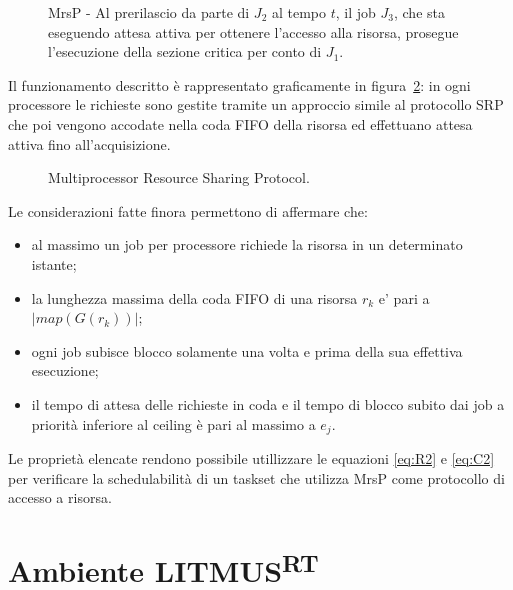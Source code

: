 \begin{figure}
\centering
\MrsPProtocols
\caption{MrsP - Al prerilascio da parte di $J_2$ al tempo $t$, il job $J_3$, che sta eseguendo attesa attiva per ottenere l'accesso alla risorsa, prosegue l'esecuzione della sezione critica per conto di $J_1$.}
\label{fig:MrsPProtocols}
\end{figure}

Il funzionamento descritto è rappresentato graficamente in figura~\ref{fig:locks.mrsp}: in ogni processore le richieste sono gestite tramite un approccio simile al protocollo SRP che poi vengono accodate nella coda FIFO della risorsa ed effettuano attesa attiva fino all'acquisizione.\\

\begin{figure}
\centering
{}
\caption{Multiprocessor Resource Sharing Protocol.}
\label{fig:locks.mrsp}
\end{figure}

Le considerazioni fatte finora permettono di affermare che:

\begin{itemize}
\item al massimo un job per processore richiede la risorsa in un determinato istante;
\item la lunghezza massima della coda FIFO di una risorsa $r_k$ e’ pari a $| map(G(r_k)) |$;
\item ogni job subisce blocco solamente una volta e prima della sua effettiva esecuzione;
\item il tempo di attesa delle richieste in coda e il tempo di blocco subito dai job a priorità inferiore al ceiling  è pari al massimo a $e_j$.
\end{itemize}

Le proprietà elencate rendono possibile utillizzare le equazioni \ref{eq:R2} e \ref{eq:C2} per verificare la schedulabilità di un taskset che utilizza MrsP come protocollo di accesso a risorsa.\\

\section{Ambiente LITMUS\textsuperscript{RT}}
\label{sec:intro.litmus}

